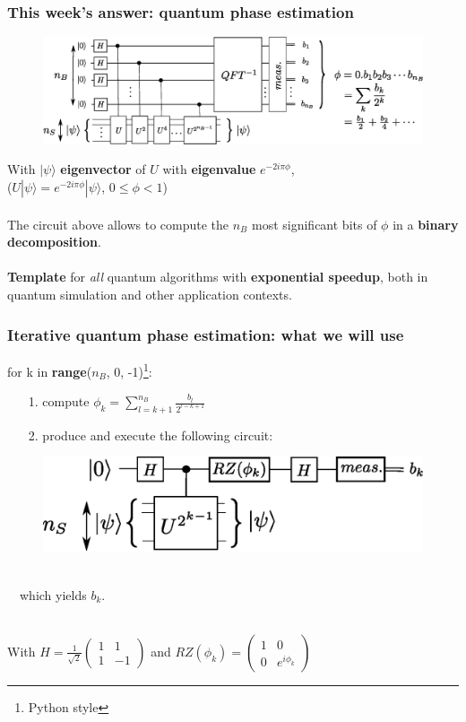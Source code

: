 \documentclass{beamer}
\begin{document}
\begin{frame}
\frametitle{This week's answer: quantum phase estimation}
\begin{center}
\begin{figure}
\includegraphics[width=\textwidth]{quantum_phase_estimation.eps}
\end{figure}
\end{center}

With $|\psi\rangle$ \textbf{eigenvector} of $U$ with \textbf{eigenvalue} $e^{-2i\pi\phi}$,\\
 ($U|\psi\rangle = e^{-2i\pi\phi}|\psi\rangle$, $0\leq\phi<1$)\\~\\
The circuit above allows to compute the $n_{B}$ most significant bits of $\phi$ in a \textbf{binary
decomposition}.\\~\\

\textbf{Template} for \emph{all} quantum algorithms with \textbf{exponential speedup}, both in quantum simulation
and other application contexts.\\
\end{frame}

\begin{frame}
\frametitle{Iterative quantum phase estimation: what we will use}

{\selectfont for k in \textbf{range}($n_{B}$, 0, -1)\footnote{Python style}:
\begin{itemize}
\item[1.] compute $\phi_{k}=\sum_{l=k+1}^{n_{B}} \frac{b_{l}}{2^{l-k+1}}$
\item[2.] produce and execute the following circuit: 
\end{itemize}
\begin{figure}
\includegraphics[width=.6\textwidth]{iterative_pea.eps}
\end{figure}~\\
$\quad$which yields $b_{k}$.\\~\\
}

With $H=\frac{1}{\sqrt{2}}\begin{pmatrix}1 & 1 \\ 1 & -1 \end{pmatrix}$ and 
$RZ(\phi_{k})=\begin{pmatrix} 1 & 0 \\ 0 & e^{i\phi_{k}}\end{pmatrix}$

\end{frame}
\end{document}

